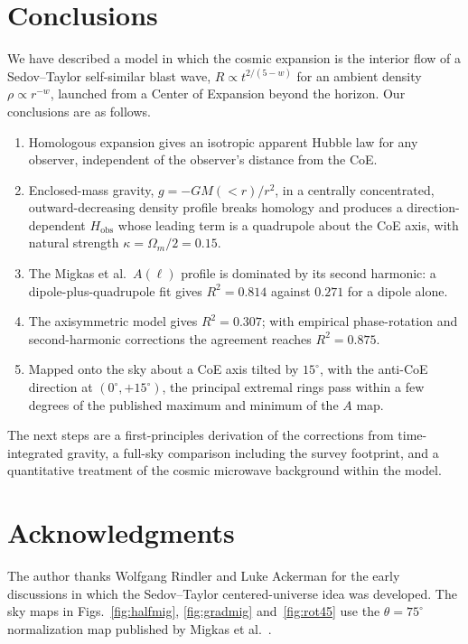 \documentclass[11pt,letterpaper]{article}
\numberwithin{equation}{section}
\begin{document}
\section{Conclusions}
\label{sec:conclusions}

We have described a model in which the cosmic expansion is the interior flow of
a Sedov--Taylor self-similar blast wave, $R\propto t^{2/(5-w)}$ for an ambient
density $\rho\propto r^{-w}$, launched from a Center of Expansion beyond the
horizon. Our conclusions are as follows.
\begin{enumerate}
\item Homologous expansion gives an isotropic apparent Hubble law for any
  observer, independent of the observer's distance from the CoE.
\item Enclosed-mass gravity, $g=-GM(<r)/r^2$, in a centrally concentrated,
  outward-decreasing density profile breaks homology and produces a
  direction-dependent $H_{\mathrm{obs}}$ whose leading term is a quadrupole about
  the CoE axis, with natural strength $\kappa=\Omega_m/2=0.15$.
\item The Migkas et al.\ $A(\ell)$ profile is dominated by its second harmonic:
  a dipole-plus-quadrupole fit gives $R^2=0.814$ against $0.271$ for a dipole
  alone.
\item The axisymmetric model gives $R^2=0.307$; with empirical phase-rotation and
  second-harmonic corrections the agreement reaches $R^2=0.875$.
\item Mapped onto the sky about a CoE axis tilted by $15^\circ$, with the
  anti-CoE direction at $(0^\circ,+15^\circ)$, the principal extremal rings pass
  within a few degrees of the published maximum and minimum of the $A$ map.
\end{enumerate}
The next steps are a first-principles derivation of the corrections from
time-integrated gravity, a full-sky comparison including the survey footprint,
and a quantitative treatment of the cosmic microwave background within the
model.

\section*{Acknowledgments}
The author thanks Wolfgang Rindler and Luke Ackerman for the early discussions
in which the Sedov--Taylor centered-universe idea was developed. The sky maps
in Figs.~\ref{fig:halfmig}, \ref{fig:gradmig} and~\ref{fig:rot45} use the
$\theta=75^\circ$ normalization map published by Migkas et al.~\citep{Migkas2020}.



\end{document}
